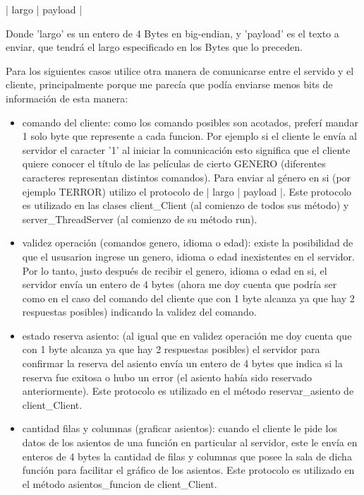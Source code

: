 \documentclass[a4paper,12pt]{report}
\begin{document}
|  largo  |   payload   |

Donde 'largo' es un entero de 4 Bytes en big-endian, y 'payload' es el texto a enviar, que tendr\'a el largo especificado en los Bytes que lo preceden.

Para los siguientes casos utilice otra manera de comunicarse entre el servido y el cliente, principalmente porque me parec\'ia que pod\'ia enviarse menos bits de informaci\'on de esta manera:

\begin{itemize}

\item comando del cliente: como los comando posibles son acotados, prefer\'i mandar 1 solo byte que represente a cada funcion. Por ejemplo si el cliente le env\'ia al servidor el caracter '1' al iniciar la comunicaci\'on esto significa que el cliente quiere conocer el t\'itulo de las pel\'iculas de cierto GENERO (diferentes caracteres representan distintos comandos). Para enviar al g\'enero en si (por ejemplo TERROR) utilizo el protocolo de |  largo  |   payload   |. Este protocolo es utilizado en las clases client\_Client (al comienzo de todos sus m\'etodo) y server\_ThreadServer (al comienzo de su m\'etodo run).

\item validez operaci\'on (comandos genero, idioma o edad): existe la posibilidad de que el ususarion ingrese un genero, idioma o edad inexistentes en el servidor. Por lo tanto, justo despu\'es de recibir el genero, idioma o edad en si, el servidor env\'ia un entero de 4 bytes (ahora me doy cuenta que podr\'ia ser como en el caso del comando del cliente que con 1 byte alcanza ya que hay 2 respuestas posibles) indicando la validez del comando. 

\item estado reserva asiento: (al igual que en validez operaci\'on me doy cuenta que con 1 byte alcanza ya que hay 2 respuestas posibles) el servidor para confirmar la reserva del asiento env\'ia un entero de 4 bytes que indica si la reserva fue exitosa o hubo un error (el asiento hab\'ia sido reservado anteriormente). Este protocolo es utilizado en el m\'etodo reservar\_asiento de client\_Client.

\item cantidad filas y columnas (graficar asientos): cuando el cliente le pide los datos de los asientos de una funci\'on en particular al servidor, este le env\'ia en enteros de 4 bytes la cantidad de filas y columnas que posee la sala de dicha funci\'on para facilitar el gr\'afico de los asientos. Este protocolo es utilizado en el m\'etodo asientos\_funcion de client\_Client.

\end{itemize}
\end{document}
